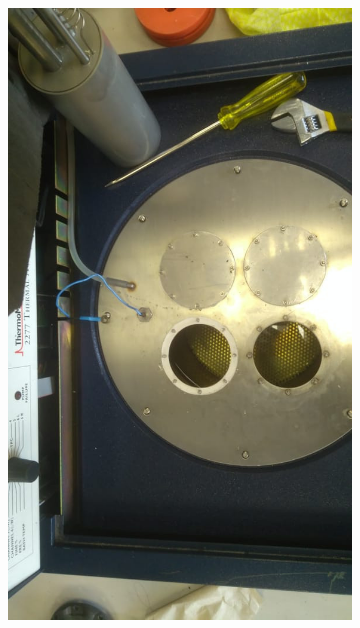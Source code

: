 \begin{figure}[h]
\begin{subfigure}{0.24\linewidth}
			\includegraphics[width=\linewidth]{Figures/process/p1}
			\caption{ }
			\label{fig: subC}
		\end{subfigure}
		\begin{subfigure}{0.24\linewidth}

\end{subfigure}
\end{figure}

